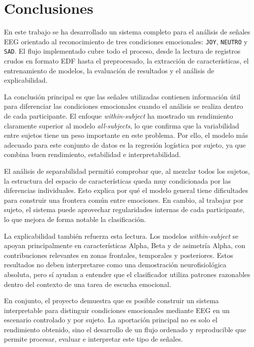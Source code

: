 
\chapter{Conclusiones}

En este trabajo se ha desarrollado un sistema completo para el análisis de señales \ac{EEG} orientado al reconocimiento de tres condiciones emocionales: \texttt{JOY}, \texttt{NEUTRO} y \texttt{SAD}. El flujo implementado cubre todo el proceso, desde la lectura de registros crudos en formato \ac{EDF} hasta el preprocesado, la extracción de características, el entrenamiento de modelos, la evaluación de resultados y el análisis de explicabilidad.

La conclusión principal es que las señales utilizadas contienen información útil para diferenciar las condiciones emocionales cuando el análisis se realiza dentro de cada participante. El enfoque \textit{within-subject} ha mostrado un rendimiento claramente superior al modelo \textit{all-subjects}, lo que confirma que la variabilidad entre sujetos tiene un peso importante en este problema. Por ello, el modelo más adecuado para este conjunto de datos es la regresión logística por sujeto, ya que combina buen rendimiento, estabilidad e interpretabilidad.

El análisis de separabilidad permitió comprobar que, al mezclar todos los sujetos, la estructura del espacio de características queda muy condicionada por las diferencias individuales. Esto explica por qué el modelo general tiene dificultades para construir una frontera común entre emociones. En cambio, al trabajar por sujeto, el sistema puede aprovechar regularidades internas de cada participante, lo que mejora de forma notable la clasificación.

La explicabilidad también refuerza esta lectura. Los modelos \textit{within-subject} se apoyan principalmente en características Alpha, Beta y de asimetría Alpha, con contribuciones relevantes en zonas frontales, temporales y posteriores. Estos resultados no deben interpretarse como una demostración neurofisiológica absoluta, pero sí ayudan a entender que el clasificador utiliza patrones razonables dentro del contexto de una tarea de escucha emocional.

En conjunto, el proyecto demuestra que es posible construir un sistema interpretable para distinguir condiciones emocionales mediante \ac{EEG} en un escenario controlado y por sujeto. La aportación principal no es solo el rendimiento obtenido, sino el desarrollo de un flujo ordenado y reproducible que permite procesar, evaluar e interpretar este tipo de señales.

